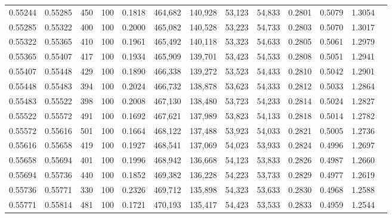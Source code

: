 \begin{tabular}{rrrrrrrrrrrrr}
0.55244 & 0.55285 &   450 & 100 &                                     0.1818 & 464,682 & 140,928 &  53,123 &  54,833 & 0.2801 & 0.5079 & 1.3054 \\
0.55285 & 0.55322 &   400 & 100 &                                     0.2000 & 465,082 & 140,528 &  53,223 &  54,733 & 0.2803 & 0.5070 & 1.3017 \\
0.55322 & 0.55365 &   410 & 100 &                                     0.1961 & 465,492 & 140,118 &  53,323 &  54,633 & 0.2805 & 0.5061 & 1.2979 \\
0.55365 & 0.55407 &   417 & 100 &                                     0.1934 & 465,909 & 139,701 &  53,423 &  54,533 & 0.2808 & 0.5051 & 1.2941 \\
0.55407 & 0.55448 &   429 & 100 &                                     0.1890 & 466,338 & 139,272 &  53,523 &  54,433 & 0.2810 & 0.5042 & 1.2901 \\
0.55448 & 0.55483 &   394 & 100 &                                     0.2024 & 466,732 & 138,878 &  53,623 &  54,333 & 0.2812 & 0.5033 & 1.2864 \\
0.55483 & 0.55522 &   398 & 100 &                                     0.2008 & 467,130 & 138,480 &  53,723 &  54,233 & 0.2814 & 0.5024 & 1.2827 \\
0.55522 & 0.55572 &   491 & 100 &                                     0.1692 & 467,621 & 137,989 &  53,823 &  54,133 & 0.2818 & 0.5014 & 1.2782 \\
0.55572 & 0.55616 &   501 & 100 &                                     0.1664 & 468,122 & 137,488 &  53,923 &  54,033 & 0.2821 & 0.5005 & 1.2736 \\
0.55616 & 0.55658 &   419 & 100 &                                     0.1927 & 468,541 & 137,069 &  54,023 &  53,933 & 0.2824 & 0.4996 & 1.2697 \\
0.55658 & 0.55694 &   401 & 100 &                                     0.1996 & 468,942 & 136,668 &  54,123 &  53,833 & 0.2826 & 0.4987 & 1.2660 \\
0.55694 & 0.55736 &   440 & 100 &                                     0.1852 & 469,382 & 136,228 &  54,223 &  53,733 & 0.2829 & 0.4977 & 1.2619 \\
0.55736 & 0.55771 &   330 & 100 &                                     0.2326 & 469,712 & 135,898 &  54,323 &  53,633 & 0.2830 & 0.4968 & 1.2588 \\
0.55771 & 0.55814 &   481 & 100 &                                     0.1721 & 470,193 & 135,417 &  54,423 &  53,533 & 0.2833 & 0.4959 & 1.2544 \\

\end{tabular}
